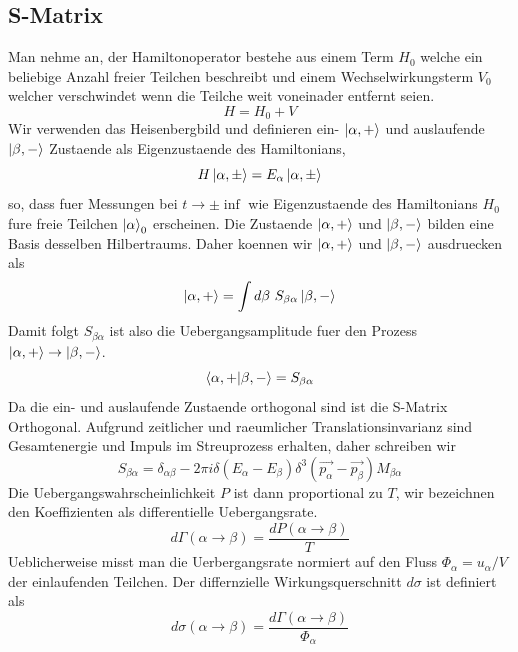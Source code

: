 \documentclass[11pt,a4paper,twocolumn]{article}
\begin{document}
\subsection{S-Matrix}
Man nehme an, der Hamiltonoperator bestehe aus einem Term $H_0$ welche ein 
beliebige Anzahl freier Teilchen beschreibt und einem Wechselwirkungsterm $V_0$
welcher verschwindet wenn die Teilche weit voneinader entfernt seien.
\begin{equation}
		H = H_0 + V
\end{equation}
Wir verwenden das Heisenbergbild und definieren ein- $\ket{\alpha, +}$ und
auslaufende $\ket{\beta, -}$ Zustaende als Eigenzustaende des Hamiltonians,
\begin{equation}
		H \ket{\alpha, \pm} = E_{\alpha} \ket{\alpha, \pm}
\end{equation}
so, dass fuer Messungen bei $t \to \pm \inf$ wie Eigenzustaende des Hamiltonians
$H_0$ fure freie Teilchen $\ket{\alpha}_0$ erscheinen.
Die Zustaende $\ket{\alpha, +}$ und $\ket{\beta, -}$ bilden eine Basis desselben
Hilbertraums. Daher koennen wir $\ket{\alpha, +}$ und $\ket{\beta, -}$
ausdruecken als 
\begin{equation}
		\ket{\alpha, +} = \int d\beta \ S_{\beta \alpha} \ket{\beta, -}
\end{equation}
Damit folgt $S_{\beta \alpha}$ ist also die Uebergangsamplitude fuer den Prozess
$\ket{\alpha, +} \to \ket{\beta, -}$.
\begin{equation}
		\bra{\alpha, +} \ket{\beta, -} =S_{\beta \alpha}
\end{equation}
Da die ein- und auslaufende Zustaende orthogonal sind ist die S-Matrix
Orthogonal.
Aufgrund zeitlicher und raeumlicher Translationsinvarianz sind Gesamtenergie und
Impuls im Streuprozess erhalten, daher schreiben wir
\begin{equation}
		S_{\beta \alpha} = \delta_{\alpha \beta} - 2 \pi i \delta(E_{\alpha} -
		E_{\beta})\delta^3(\vec{p_{\alpha}}-\vec{p_{\beta}}) M_{\beta \alpha}
\end{equation}
Die Uebergangswahrscheinlichkeit $P$ ist dann proportional zu $T$, wir
bezeichnen den Koeffizienten als differentielle Uebergangsrate.
\begin{equation}
		d\Gamma(\alpha \to \beta) = \frac{dP(\alpha \to \beta)}{T}
\end{equation}
Ueblicherweise misst man die Uerbergangsrate normiert auf den Fluss
$\Phi_{\alpha} = u_{\alpha}/V$ der einlaufenden Teilchen.
Der differnzielle Wirkungsquerschnitt $d\sigma$ ist definiert als
\begin{equation}
		d\sigma(\alpha \to \beta) = \frac{d\Gamma(\alpha \to
		\beta)}{\Phi_{\alpha}}
\end{equation}
\end{document}
